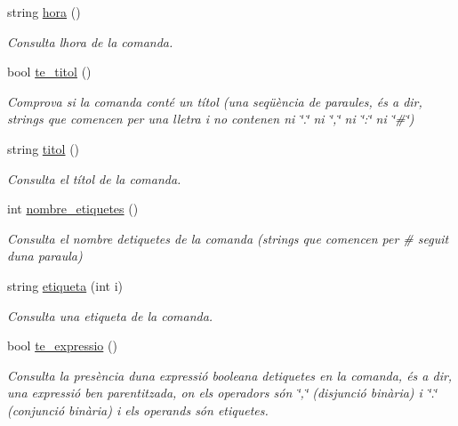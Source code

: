 \begin{DoxyCompactItemize}
string \hyperlink{class_comanda_ae8bca2ad702d3316dc1c53dcab7cac02}{hora} ()
\begin{DoxyCompactList}\small\item\em Consulta l\textquotesingle{}hora de la comanda. \end{DoxyCompactList}\item 
bool \hyperlink{class_comanda_a5452f5a877d58627cd2bd871cf31b074}{te\+\_\+titol} ()
\begin{DoxyCompactList}\small\item\em Comprova si la comanda conté un títol (una seqüència de paraules, és a dir, strings que comencen per una lletra i no contenen ni \char`\"{}.\char`\"{} ni \char`\"{},\char`\"{} ni \char`\"{}\+:\char`\"{} ni \char`\"{}\#\char`\"{}) \end{DoxyCompactList}\item 
string \hyperlink{class_comanda_ad1cefdda3db389d9ab536a59e2ee907d}{titol} ()
\begin{DoxyCompactList}\small\item\em Consulta el títol de la comanda. \end{DoxyCompactList}\item 
int \hyperlink{class_comanda_a4280b6ae2d435d9c21bbed364cb1db3d}{nombre\+\_\+etiquetes} ()
\begin{DoxyCompactList}\small\item\em Consulta el nombre d\textquotesingle{}etiquetes de la comanda (strings que comencen per \# seguit d\textquotesingle{}una paraula) \end{DoxyCompactList}\item 
string \hyperlink{class_comanda_ac80e9a80d16c6bac9a134e431bca1ed0}{etiqueta} (int i)
\begin{DoxyCompactList}\small\item\em Consulta una etiqueta de la comanda. \end{DoxyCompactList}\item 
bool \hyperlink{class_comanda_a81d17f4233e33f3baac7633546c066f0}{te\+\_\+expressio} ()
\begin{DoxyCompactList}\small\item\em Consulta la presència d\textquotesingle{}una expressió booleana d\textquotesingle{}etiquetes en la comanda, és a dir, una expressió ben parentitzada, on els operadors són \char`\"{},\char`\"{} (disjunció binària) i \char`\"{}.\char`\"{} (conjunció binària) i els operands són etiquetes. \end{DoxyCompactList}\item 

\end{DoxyCompactItemize}
